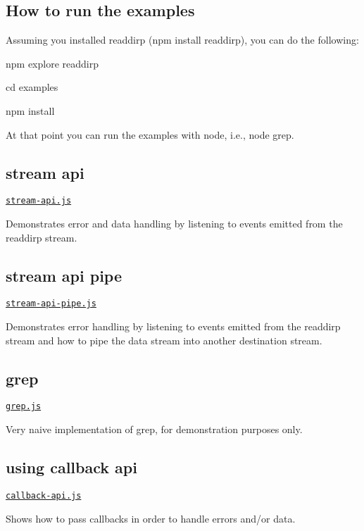\subsection*{How to run the examples}

Assuming you installed readdirp ({\ttfamily npm install readdirp}), you can do the following\+:


\begin{DoxyEnumerate}
\item {\ttfamily npm explore readdirp}
\item {\ttfamily cd examples}
\item {\ttfamily npm install}
\end{DoxyEnumerate}

At that point you can run the examples with node, i.\+e., {\ttfamily node grep}.

\subsection*{stream api}

\href{https://github.com/thlorenz/readdirp/blob/master/examples/stream-api.js}{\tt stream-\/api.\+js}

Demonstrates error and data handling by listening to events emitted from the readdirp stream.

\subsection*{stream api pipe}

\href{https://github.com/thlorenz/readdirp/blob/master/examples/stream-api-pipe.js}{\tt stream-\/api-\/pipe.\+js}

Demonstrates error handling by listening to events emitted from the readdirp stream and how to pipe the data stream into another destination stream.

\subsection*{grep}

\href{https://github.com/thlorenz/readdirp/blob/master/examples/grep.js}{\tt grep.\+js}

Very naive implementation of grep, for demonstration purposes only.

\subsection*{using callback api}

\href{https://github.com/thlorenz/readdirp/blob/master/examples/callback-api.js}{\tt callback-\/api.\+js}

Shows how to pass callbacks in order to handle errors and/or data. 